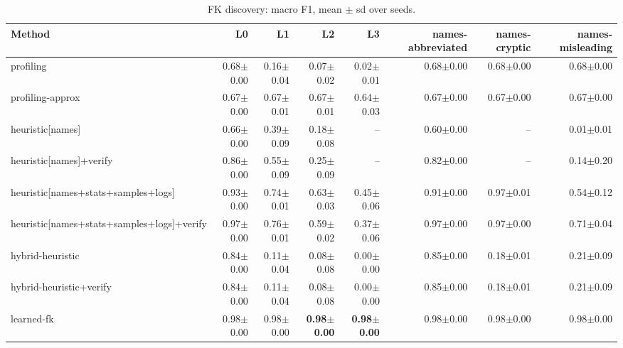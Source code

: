 
\begin{table}[t]
  \centering
  \scriptsize
  \caption{FK discovery: macro F1, mean $\pm$ sd over seeds.}
  \label{tab:bench-fk}
  \begin{tabular}{lrrrrrrr}
    \toprule
    Method & L0 & L1 & L2 & L3 & names-abbreviated & names-cryptic & names-misleading \\
    \midrule
    profiling & 0.68{\scriptsize$\pm$0.00} & 0.16{\scriptsize$\pm$0.04} & 0.07{\scriptsize$\pm$0.02} & 0.02{\scriptsize$\pm$0.01} & 0.68{\scriptsize$\pm$0.00} & 0.68{\scriptsize$\pm$0.00} & 0.68{\scriptsize$\pm$0.00} \\
    profiling-approx & 0.67{\scriptsize$\pm$0.00} & 0.67{\scriptsize$\pm$0.01} & 0.67{\scriptsize$\pm$0.01} & 0.64{\scriptsize$\pm$0.03} & 0.67{\scriptsize$\pm$0.00} & 0.67{\scriptsize$\pm$0.00} & 0.67{\scriptsize$\pm$0.00} \\
    heuristic[names] & 0.66{\scriptsize$\pm$0.00} & 0.39{\scriptsize$\pm$0.09} & 0.18{\scriptsize$\pm$0.08} & -- & 0.60{\scriptsize$\pm$0.00} & -- & 0.01{\scriptsize$\pm$0.01} \\
    heuristic[names]+verify & 0.86{\scriptsize$\pm$0.00} & 0.55{\scriptsize$\pm$0.09} & 0.25{\scriptsize$\pm$0.09} & -- & 0.82{\scriptsize$\pm$0.00} & -- & 0.14{\scriptsize$\pm$0.20} \\
    heuristic[names+stats+samples+logs] & 0.93{\scriptsize$\pm$0.00} & 0.74{\scriptsize$\pm$0.01} & 0.63{\scriptsize$\pm$0.03} & 0.45{\scriptsize$\pm$0.06} & 0.91{\scriptsize$\pm$0.00} & 0.97{\scriptsize$\pm$0.01} & 0.54{\scriptsize$\pm$0.12} \\
    heuristic[names+stats+samples+logs]+verify & 0.97{\scriptsize$\pm$0.00} & 0.76{\scriptsize$\pm$0.01} & 0.59{\scriptsize$\pm$0.02} & 0.37{\scriptsize$\pm$0.06} & 0.97{\scriptsize$\pm$0.00} & 0.97{\scriptsize$\pm$0.00} & 0.71{\scriptsize$\pm$0.04} \\
    hybrid-heuristic & 0.84{\scriptsize$\pm$0.00} & 0.11{\scriptsize$\pm$0.04} & 0.08{\scriptsize$\pm$0.08} & 0.00{\scriptsize$\pm$0.00} & 0.85{\scriptsize$\pm$0.00} & 0.18{\scriptsize$\pm$0.01} & 0.21{\scriptsize$\pm$0.09} \\
    hybrid-heuristic+verify & 0.84{\scriptsize$\pm$0.00} & 0.11{\scriptsize$\pm$0.04} & 0.08{\scriptsize$\pm$0.08} & 0.00{\scriptsize$\pm$0.00} & 0.85{\scriptsize$\pm$0.00} & 0.18{\scriptsize$\pm$0.01} & 0.21{\scriptsize$\pm$0.09} \\
    learned-fk & 0.98{\scriptsize$\pm$0.00} & 0.98{\scriptsize$\pm$0.00} & \textbf{0.98{\scriptsize$\pm$0.00}} & \textbf{0.98{\scriptsize$\pm$0.00}} & 0.98{\scriptsize$\pm$0.00} & 0.98{\scriptsize$\pm$0.00} & 0.98{\scriptsize$\pm$0.00} \\

\end{tabular}
\end{table}
